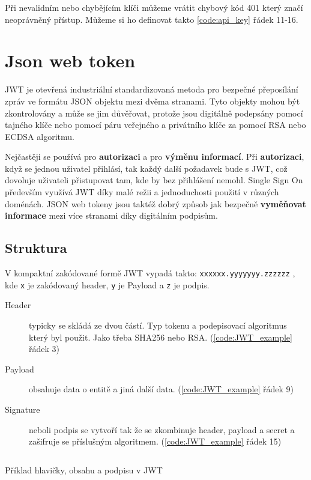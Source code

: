 Při nevalidním nebo chybějícím klíči můžeme vrátit chybový kód 401 který značí neoprávněný přístup. Můžeme si ho definovat takto \ref{code:api_key} řádek 11-16.





\section{Json web token} %
JWT je otevřená industriální standardizovaná %
metoda pro bezpečné přeposílání zpráv ve formátu JSON objektu mezi dvěma stranami.
Tyto objekty mohou být zkontrolovány a může se jim důvěřovat, protože jsou digitálně podepsány pomocí tajného klíče nebo pomocí páru veřejného a privátního klíče za pomocí RSA nebo ECDSA algoritmu.

Nejčastěji se používá pro \textbf{autorizaci} a pro \textbf{výměnu informací}. Při \textbf{autorizaci}, když se jednou uživatel přihlásí, tak každý další požadavek bude s JWT, což dovoluje uživateli přistupovat tam, kde by bez přihlášení nemohl. Single Sign On
především využívá JWT díky malé režii a jednoduchosti použití v různých doménách. JSON web tokeny jsou taktéž dobrý způsob jak bezpečně \textbf{vyměňovat informace} mezi více stranami díky digitálním podpisům.

\subsection{Struktura}
V kompaktní zakódované formě JWT vypadá takto: \texttt{xxxxxx.yyyyyyy.zzzzzz} , kde \texttt{x} je zakódovaný header, \texttt{y} je Payload a \texttt{z} je podpis.

\begin{description}
    \item[Header] typicky se skládá ze dvou částí. Typ tokenu a podepisovací algoritmus který byl použit. Jako třeba SHA256 nebo RSA. (\ref{code:JWT_example} řádek 3)
    \item[Payload] obsahuje data o entitě a jiná další data. (\ref{code:JWT_example} řádek 9)
    \item[Signature] neboli podpis se vytvoří tak že se zkombinuje header, payload a secret a zašifruje se příslušným algoritmem. (\ref{code:JWT_example} řádek 15)
\end{description}

\begin{listing}[ht]
    \inputminted[]{json}{resources/code/security/JWT.jsonc}
    \caption{Příklad hlavičky, obsahu a podpisu v JWT} %
    \label{code:JWT_example}
\end{listing}






